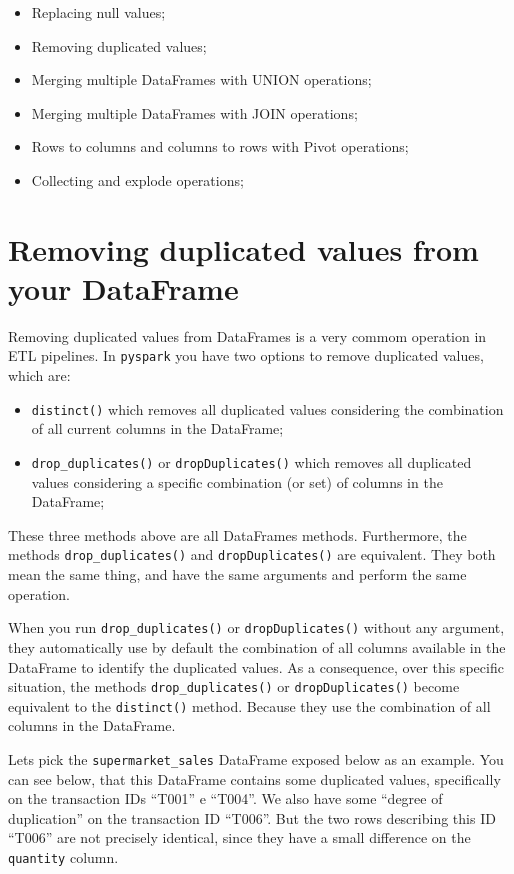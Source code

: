 \documentclass[
  11pt,
  letterpaper,
  DIV=11,
  numbers=noendperiod]{scrreprt}
\providecommand{\tightlist}{%
  \setlength{\itemsep}{0pt}\setlength{\parskip}{0pt}}\usepackage{longtable,booktabs,array}
\begin{document}
\begin{itemize}
\tightlist
\item
  Replacing null values;
\item
  Removing duplicated values;
\item
  Merging multiple DataFrames with UNION operations;
\item
  Merging multiple DataFrames with JOIN operations;
\item
  Rows to columns and columns to rows with Pivot operations;
\item
  Collecting and explode operations;
\end{itemize}

\hypertarget{sec-remove-duplicates}{%
\section{Removing duplicated values from your
DataFrame}\label{sec-remove-duplicates}}

Removing duplicated values from DataFrames is a very commom operation in
ETL pipelines. In \texttt{pyspark} you have two options to remove
duplicated values, which are:

\begin{itemize}
\tightlist
\item
  \texttt{distinct()} which removes all duplicated values considering
  the combination of all current columns in the DataFrame;
\item
  \texttt{drop\_duplicates()} or \texttt{dropDuplicates()} which removes
  all duplicated values considering a specific combination (or set) of
  columns in the DataFrame;
\end{itemize}

These three methods above are all DataFrames methods. Furthermore, the
methods \texttt{drop\_duplicates()} and \texttt{dropDuplicates()} are
equivalent. They both mean the same thing, and have the same arguments
and perform the same operation.

When you run \texttt{drop\_duplicates()} or \texttt{dropDuplicates()}
without any argument, they automatically use by default the combination
of all columns available in the DataFrame to identify the duplicated
values. As a consequence, over this specific situation, the methods
\texttt{drop\_duplicates()} or \texttt{dropDuplicates()} become
equivalent to the \texttt{distinct()} method. Because they use the
combination of all columns in the DataFrame.

Lets pick the \texttt{supermarket\_sales} DataFrame exposed below as an
example. You can see below, that this DataFrame contains some duplicated
values, specifically on the transaction IDs ``T001'' e ``T004''. We also
have some ``degree of duplication'' on the transaction ID ``T006''. But
the two rows describing this ID ``T006'' are not precisely identical,
since they have a small difference on the \texttt{quantity} column.
\end{document}
